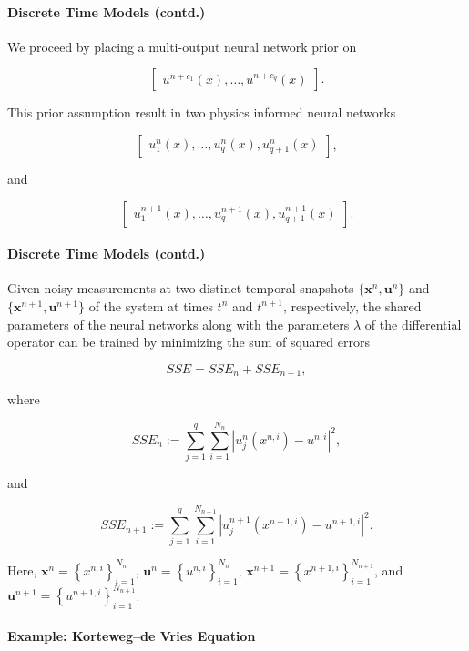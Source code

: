 \documentclass[book.tex]{subfiles}
\begin{document}
\paragraph{Discrete Time Models
(contd.)}\label{discrete-time-models-contd.-1}

We proceed by placing a multi-output neural network prior on

\[
\begin{bmatrix}
u^{n+c_1}(x), \ldots, u^{n+c_q}(x)
\end{bmatrix}.
\]

This prior assumption result in two physics informed neural networks

\[
\begin{bmatrix}
u^{n}_1(x), \ldots, u^{n}_q(x), u^{n}_{q+1}(x)
\end{bmatrix},
\]

and

\[
\begin{bmatrix}
u^{n+1}_1(x), \ldots, u^{n+1}_q(x), u^{n+1}_{q+1}(x)
\end{bmatrix}.
\]

\paragraph{Discrete Time Models
(contd.)}\label{discrete-time-models-contd.-2}

Given noisy measurements at two distinct temporal snapshots
$\{\mathbf{x}^{n}, \mathbf{u}^{n}\}$ and
$\{\mathbf{x}^{n+1}, \mathbf{u}^{n+1}\}$ of the system at times $t^{n}$
and $t^{n+1}$, respectively, the shared parameters of the neural
networks along with the parameters $\lambda$ of the differential
operator can be trained by minimizing the sum of squared errors

\[
SSE = SSE_n + SSE_{n+1},
\]

where

\[
SSE_n := \sum_{j=1}^q \sum_{i=1}^{N_n} |u^n_j(x^{n,i}) - u^{n,i}|^2,
\]

and

\[
SSE_{n+1} := \sum_{j=1}^q \sum_{i=1}^{N_{n+1}} |u^{n+1}_j(x^{n+1,i}) - u^{n+1,i}|^2.
\]

Here, $\mathbf{x}^n = \left\{x^{n,i}\right\}_{i=1}^{N_n}$,
$\mathbf{u}^n = \left\{u^{n,i}\right\}_{i=1}^{N_n}$,
$\mathbf{x}^{n+1} = \left\{x^{n+1,i}\right\}_{i=1}^{N_{n+1}}$, and
$\mathbf{u}^{n+1} = \left\{u^{n+1,i}\right\}_{i=1}^{N_{n+1}}$.

\paragraph{Example: Korteweg--de Vries
Equation}\label{example-kortewegde-vries-equation}
\end{document}
